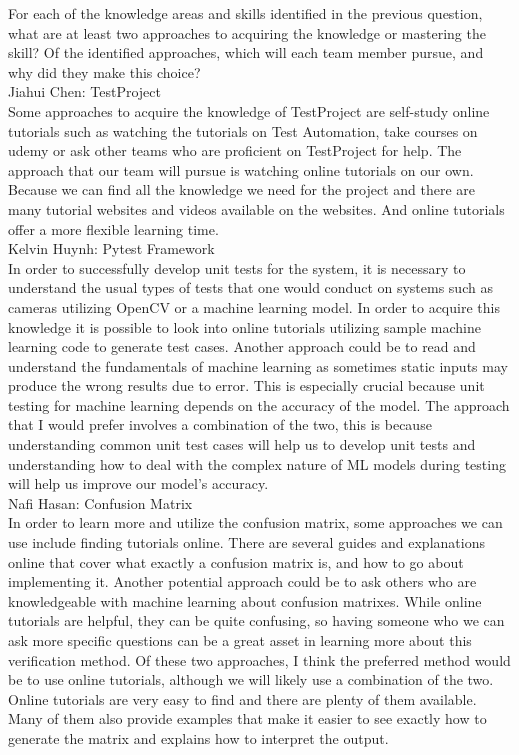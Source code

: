 \documentclass[12pt]{article}
\begin{document}
\begin{outline}[enumerate]
  \1 For each of the knowledge areas and skills identified in the previous question, what are at least two approaches to acquiring the knowledge or
  mastering the skill? Of the identified approaches, which will each team member pursue, and why did they make this choice?\\
    \2 Jiahui Chen: TestProject\\
    Some approaches to acquire the knowledge of TestProject are self-study online tutorials such as watching the tutorials on Test Automation, take courses on udemy or ask 
    other teams who are proficient on TestProject for help. The approach that our team will pursue is watching online tutorials on our own. Because we can find all the 
    knowledge we need for the project and there are many tutorial websites and videos available on the websites. And online tutorials offer a more flexible learning time.\\
    \2 Kelvin Huynh: Pytest Framework\\
    In order to successfully develop unit tests for the system, it is necessary to understand the usual types of tests that one would conduct on systems such as cameras 
    utilizing OpenCV or a machine learning model. In order to acquire this knowledge it is possible to look into online tutorials utilizing sample machine learning code to 
    generate test cases. Another approach could be to read and understand the fundamentals of machine learning as sometimes static inputs may produce the wrong results due 
    to error. This is especially crucial because unit testing for machine learning depends on the accuracy of the model. The approach that I would prefer involves a combination 
    of the two, this is because understanding common unit test cases will help us to develop unit tests and understanding how to deal with the complex nature of ML models 
    during testing will help us improve our model’s accuracy.\\
    \2 Nafi Hasan: Confusion Matrix\\
In order to learn more and utilize the confusion matrix, some approaches we can use include finding tutorials online. There are several guides and explanations online
that cover what exactly a confusion matrix is, and how to go about implementing it. Another potential approach could be to ask others who are knowledgeable with machine 
learning about confusion matrixes. While online tutorials are helpful, they can be quite confusing, so having someone who we can ask more specific questions can be a 
great asset in learning more about this verification method. Of these two approaches, I think the preferred method would be to use online tutorials, although we will 
likely use a combination of the two. Online tutorials are very easy to find and there are plenty of them available. Many of them also provide examples that make it 
easier to see exactly how to generate the matrix and explains how to interpret the output.\\

  
\end{outline}
\end{document}
